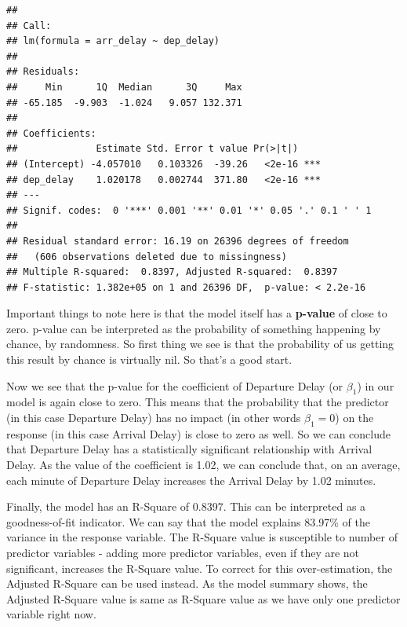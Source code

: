 \documentclass[10pt, letterpaper, twoside]{memoir}\usepackage{knitr}
\begin{document}
\begin{knitrout}
\color{fgcolor}\begin{kframe}
\begin{alltt}
\end{alltt}
\begin{verbatim}
## 
## Call:
## lm(formula = arr_delay ~ dep_delay)
## 
## Residuals:
##     Min      1Q  Median      3Q     Max 
## -65.185  -9.903  -1.024   9.057 132.371 
## 
## Coefficients:
##              Estimate Std. Error t value Pr(>|t|)    
## (Intercept) -4.057010   0.103326  -39.26   <2e-16 ***
## dep_delay    1.020178   0.002744  371.80   <2e-16 ***
## ---
## Signif. codes:  0 '***' 0.001 '**' 0.01 '*' 0.05 '.' 0.1 ' ' 1
## 
## Residual standard error: 16.19 on 26396 degrees of freedom
##   (606 observations deleted due to missingness)
## Multiple R-squared:  0.8397,	Adjusted R-squared:  0.8397 
## F-statistic: 1.382e+05 on 1 and 26396 DF,  p-value: < 2.2e-16
\end{verbatim}
\end{kframe}
\end{knitrout}

Important things to note here is that the model itself has a \textbf{p-value}  of close to zero. p-value can be interpreted as the probability of something happening by chance, by randomness. So first thing we see is that the probability of us getting this result by chance is virtually nil. So that's a good start. 

Now we see that the p-value for the coefficient of Departure Delay (or $\beta_1$) in our model is again close to zero. This means that the probability that the predictor (in this case Departure Delay) has no impact (in other words $\beta_1 = 0$) on the response (in this case Arrival Delay) is close to zero as well. So we can conclude that Departure Delay has a statistically significant relationship with Arrival Delay. As the value of the coefficient is 1.02, we can conclude that, on an average, each minute of Departure Delay increases the Arrival Delay by 1.02 minutes.

Finally, the model has an R-Square of 0.8397. This can be interpreted as a goodness-of-fit indicator. We can say that the model explains 83.97\% of the variance in the response variable. The R-Square value is susceptible to number of predictor variables - adding more predictor variables, even if they are not significant, increases the R-Square value. To correct for this over-estimation, the Adjusted R-Square  can be used instead. As the model summary shows, the Adjusted R-Square value is same as R-Square value as we have only one predictor variable right now.
\end{document}
